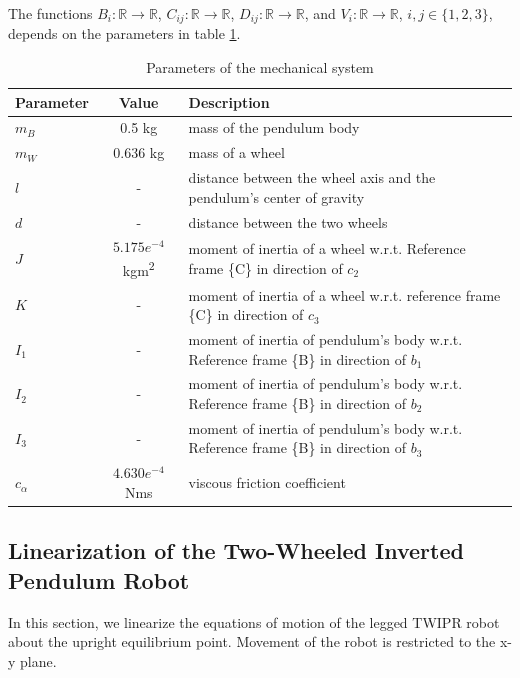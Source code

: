 The functions $B_i: \mathbb{R} \rightarrow \mathbb{R}$, $C_{ij}: \mathbb{R} \rightarrow \mathbb{R}$, $D_{ij}: \mathbb{R} \rightarrow \mathbb{R}$, and $V_i: \mathbb{R} \rightarrow \mathbb{R}$, $i,j \in \{1,2,3\}$, depends on the parameters in table \ref{tab:parameters}.
	\begin{table}[h]
		\centering
		\caption{Parameters of the mechanical system}
		\label{tab:parameters}
		\begin{tabular}{lcl}
			\toprule
			Parameter & Value & Description \\
			\midrule
			$m_B$ & 0.5 kg & mass of the pendulum body \\
			$m_W$ & 0.636 kg & mass of a wheel \\
			$l$ & - & distance between the wheel axis and the pendulum's center of gravity \\
			$d$ & - & distance between the two wheels \\
			$J$ & \(5.175 e^{-4}\) kgm\textsuperscript{2} & moment of inertia of a wheel w.r.t. Reference frame \{C\} in direction of \(c_2\) \\
			$K$ & - & moment of inertia of a wheel w.r.t. reference frame \{C\} in direction of \(c_3\) \\
			$I_1$ & - & moment of inertia of pendulum's body w.r.t. Reference frame \{B\} in direction of \(b_1\) \\
			$I_2$ & - & moment of inertia of pendulum's body w.r.t. Reference frame \{B\} in direction of \(b_2\) \\
			$I_3$ & - & moment of inertia of pendulum's body w.r.t. Reference frame \{B\} in direction of \(b_3\) \\
			$c_\alpha$ & \(4.630 e^{-4}\) Nms & viscous friction coefficient \\
			\bottomrule
		\end{tabular}
	\end{table}
	
	

\subsection{Linearization of the Two-Wheeled Inverted Pendulum Robot}
In this section, we linearize the equations of motion of the legged TWIPR robot about the upright equilibrium point. Movement of the robot is restricted to the x-y plane.

